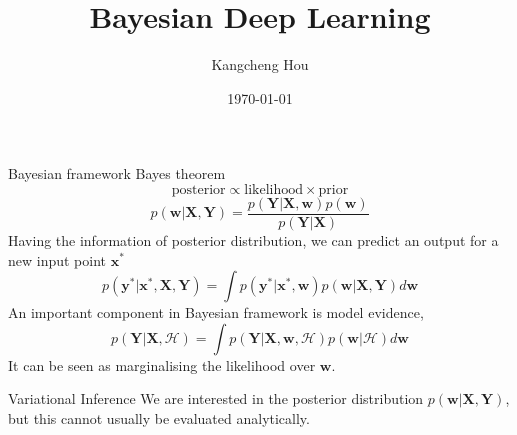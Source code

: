 \documentclass{beamer}
\title{Bayesian Deep Learning}
\author{Kangcheng Hou}
\institute{Zhejiang University}
\date{\today}
\begin{document}
    
\frame{\titlepage}

\begin{frame}{Bayesian framework}
Bayes theorem
$$\text{posterior} \propto \text{likelihood} \times \text{prior}$$
$$p(\mathbf{w} | \mathbf{X}, \mathbf{Y}) = \frac{p(\mathbf{Y} | \mathbf{X}, \mathbf{w}) p(\mathbf{w})}{p(\mathbf{Y} | \mathbf{X})}$$
Having the information of posterior distribution, we can predict an output for a new input point $\mathbf{x}^\ast$
$$p(\mathbf{y}^\ast | \mathbf{x}^\ast, \mathbf{X}, \mathbf{Y}) = \int p(\mathbf{y}^\ast |  \mathbf{x}^\ast, \mathbf{w}) p (\mathbf{w} | \mathbf{X}, \mathbf{Y}) d \mathbf{w}$$
An important component in Bayesian framework is model evidence,
$$p(\mathbf{Y} | \mathbf{X}, \mathcal{H}) = \int p(\mathbf{Y} | \mathbf{X}, \mathbf{w}, \mathcal{H}) p(\mathbf{w} | \mathcal{H}) d\mathbf{w}$$
It can be seen as marginalising the likelihood over $\mathbf{w}$.
\end{frame}

\begin{frame}{Variational Inference}
We are interested in the posterior distribution $p(\mathbf{w} | \mathbf{X}, \mathbf{Y})$, but this cannot usually be evaluated analytically. 

\end{frame}
\end{document}
